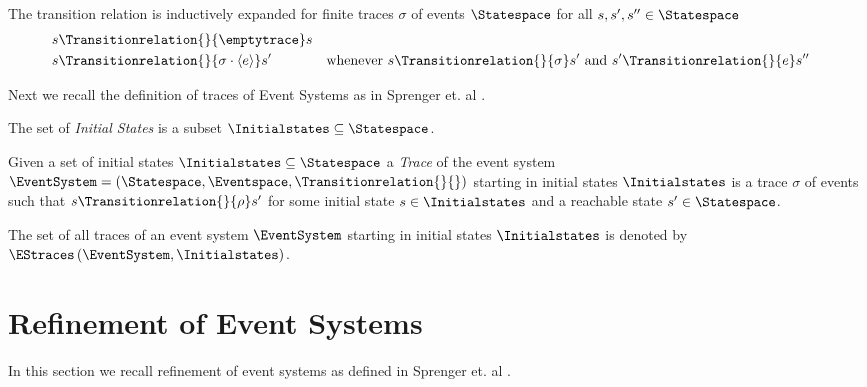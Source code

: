 \begin{definition}
    \label{def:transition-relation-extension}
    The transition relation is inductively expanded for finite traces $\sigma$
    of events $\Statespace$ for all
    $s,s',s'' \in \Statespace$
    \begin{align}
        s &\Transitionrelation{}{\emptytrace} s \\
        s &\Transitionrelation{}{\sigma \cdot \left\langle e \right\rangle} s'
        && \text{whenever } 
        s \Transitionrelation{}{\sigma} s' \text{ and }
        s' \Transitionrelation{}{e} s''
    \end{align}
\end{definition}

Next we recall the definition of traces of Event Systems as in Sprenger et. al
\cite{igloo}.

\begin{definition}
    \label{def:event-system-initial-states}
    The set of \emph{Initial States} is a subset
    $\Initialstates \subseteq \Statespace$.
\end{definition}

\begin{definition}
    \label{def:event-system-trace}
    Given a set of initial states $\Initialstates \subseteq \Statespace$
    a \emph{Trace} of the event system
    $\EventSystem = \left(\Statespace, \Eventspace, \Transitionrelation{}{} \right)$
    starting in initial states $\Initialstates$ is a trace $\sigma$ of events
    such that $s \Transitionrelation{}{\rho} s'$ for some initial state
    $s \in \Initialstates$ and a reachable state $s' \in \Statespace$.
\end{definition}

The set of all traces of an event system $\EventSystem$ starting in initial states
$\Initialstates$ is denoted by $\EStraces\left(\EventSystem, \Initialstates \right)$.

\section{Refinement of Event Systems}
\label{section:event-system-refinement}

In this section we recall refinement of event systems as defined in Sprenger et. al
\cite{igloo}.

